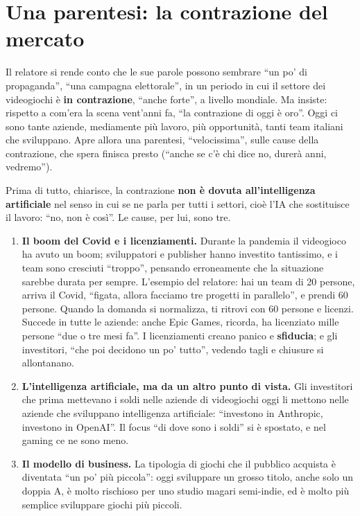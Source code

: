 \section{Una parentesi: la contrazione del mercato}
\label{z9:sec:contrazione}

Il relatore si rende conto che le sue parole possono sembrare ``un po' di
propaganda'', ``una campagna elettorale'', in un periodo in cui il settore dei
videogiochi è \textbf{in contrazione}, ``anche forte'', a livello mondiale. Ma
insiste: rispetto a com'era la scena vent'anni fa, ``la contrazione di oggi è
oro''. Oggi ci sono tante aziende, mediamente più lavoro, più opportunità, tanti
team italiani che sviluppano. Apre allora una parentesi, ``velocissima'', sulle
cause della contrazione, che spera finisca presto (``anche se c'è chi dice no,
durerà anni, vedremo'').

Prima di tutto, chiarisce, la contrazione \textbf{non è dovuta all'intelligenza
artificiale} nel senso in cui se ne parla per tutti i settori, cioè l'IA che
sostituisce il lavoro: ``no, non è così''. Le cause, per lui, sono tre.

\begin{enumerate}
  \item \textbf{Il boom del Covid e i licenziamenti.} Durante la pandemia il
        videogioco ha avuto un boom; sviluppatori e publisher hanno investito
        tantissimo, e i team sono cresciuti ``troppo'', pensando erroneamente che
        la situazione sarebbe durata per sempre. L'esempio del relatore: hai un
        team di 20 persone, arriva il Covid, ``figata, allora facciamo tre
        progetti in parallelo'', e prendi 60 persone. Quando la domanda si
        normalizza, ti ritrovi con 60 persone e licenzi. Succede in tutte le
        aziende: anche Epic Games, ricorda, ha licenziato mille persone ``due o
        tre mesi fa''. I licenziamenti creano panico e \textbf{sfiducia}; e gli
        investitori, ``che poi decidono un po' tutto'', vedendo tagli e chiusure
        si allontanano.
  \item \textbf{L'intelligenza artificiale, ma da un altro punto di vista.} Gli
        investitori che prima mettevano i soldi nelle aziende di videogiochi
        oggi li mettono nelle aziende che sviluppano intelligenza artificiale:
        ``investono in Anthropic, investono in OpenAI''. Il focus ``di dove sono
        i soldi'' si è spostato, e nel gaming ce ne sono meno.
  \item \textbf{Il modello di business.} La tipologia di giochi che il pubblico
        acquista è diventata ``un po' più piccola'': oggi sviluppare un grosso
        titolo, anche solo un doppia A, è molto rischioso per uno studio magari
        semi-indie, ed è molto più semplice sviluppare giochi più piccoli.
\end{enumerate}

